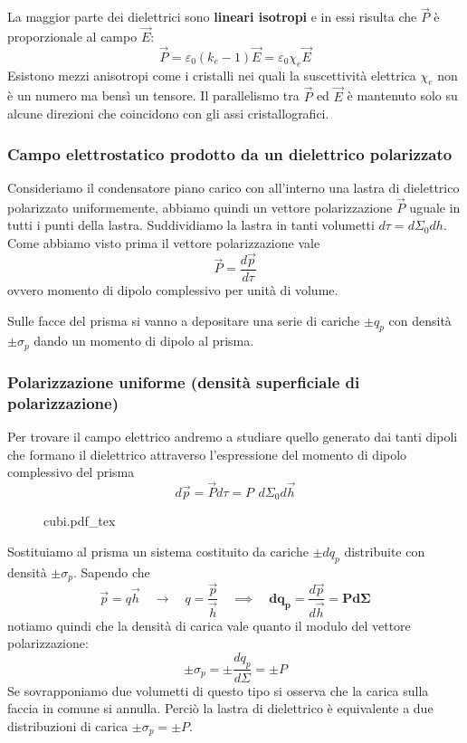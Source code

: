 \documentclass[x11names]{report}
\newcommand{\incfig}[1]{%
	{#1.pdf_tex}
}
\begin{document}
La maggior parte dei dielettrici sono \textbf{lineari isotropi} e in essi risulta che \(\vec{P}\) è proporzionale al campo \(\vec{E}\):
\[
\vec{P} = \varepsilon_0(k_e -1)\vec{E} = \varepsilon_0 \chi_e \vec{E}
\]
Esistono mezzi anisotropi come i cristalli nei quali la suscettività elettrica \(\chi_e\) non è un numero ma bensì un tensore. Il parallelismo tra \(\vec{P}\) ed \(\vec{E}\) è mantenuto solo su alcune direzioni che coincidono con gli assi cristallografici.

\subsubsection{Campo elettrostatico prodotto da un dielettrico polarizzato}
Consideriamo il condensatore piano carico con all'interno una lastra di dielettrico polarizzato uniformemente, abbiamo quindi un vettore polarizzazione \(\vec{P}\) uguale in tutti i punti della lastra. Suddividiamo la lastra in tanti volumetti \(d\tau = d\Sigma_0 dh\). Come abbiamo visto prima il vettore polarizzazione vale
\[
\vec{P} = \frac{d\vec{p}}{d\tau}
\]
ovvero momento di dipolo complessivo per unità di volume.

Sulle facce del prisma si vanno a depositare una serie di cariche \(\pm q_p\) con densità \(\pm \sigma_p\) dando un momento di dipolo al prisma.

\subsubsection{Polarizzazione uniforme (densità superficiale di polarizzazione)}
Per trovare il campo elettrico andremo a studiare quello generato dai tanti dipoli che formano il dielettrico attraverso l'espressione del momento di dipolo complessivo del prisma
\[
d\vec{p} = \vec{P}d\tau = P \,\ d\Sigma_0 d\vec{h}
\]

\begin{figure}[H]
	\centering
	\incfig{cubi}
\end{figure}

Sostituiamo al prisma un sistema costituito da cariche \(\pm dq_p\) distribuite con densità \(\pm\sigma_p\). Sapendo che 
\[
\vec{p} = q \vec{h} \quad \to \quad q = \frac{\vec{p}}{\vec{h}} \quad \implies \quad \boldsymbol{dq_p =} \frac{d\vec{p}}{d\vec{h}} \boldsymbol{= Pd\Sigma}
\]
notiamo quindi che la densità di carica vale quanto il modulo del vettore polarizzazione:
\[
\pm\sigma_p = \pm\frac{dq_p}{d\Sigma} =\pm P
\]
Se sovrapponiamo due volumetti di questo tipo si osserva che la carica sulla faccia in comune si annulla. Perciò la lastra di dielettrico è equivalente a due distribuzioni di carica \(\pm \sigma_p = \pm P\).
\end{document}
